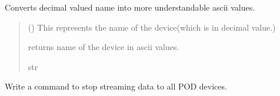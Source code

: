 \documentclass[letterpaper,10pt,english]{sphinxmanual}
\begin{document}
\begin{fulllineitems}
\begin{fulllineitems}
\label{\detokenize{Setup.SetupOneDevice:Setup.SetupOneDevice.Setup_8274D.Setup8274D.NameDecode}}
\pysigstartsignatures
{}
\pysigstopsignatures
\sphinxAtStartPar
Converts decimal valued name into more understandable ascii values.
\begin{quote}\begin{description}
\sphinxAtStartPar
{} () \textendash{} This represents the name of the device(which is in decimal value.)

\sphinxAtStartPar
returns name of the device in ascii values.

\sphinxAtStartPar
str

\end{description}\end{quote}

\end{fulllineitems}


\begin{fulllineitems}
\label{\detokenize{Setup.SetupOneDevice:Setup.SetupOneDevice.Setup_8274D.Setup8274D.StopStream}}
\pysigstartsignatures
{}
\pysigstopsignatures
\sphinxAtStartPar
Write a command to stop streaming data to all POD devices.

\end{fulllineitems}



\end{fulllineitems}
\end{document}
